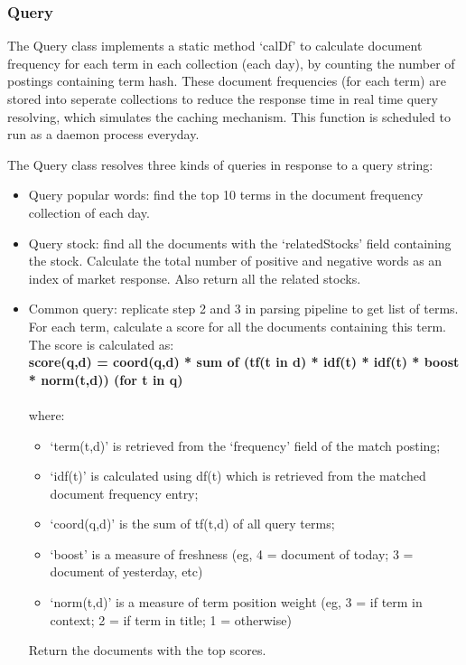\documentclass{article}
\begin{document}
\subsubsection{Query}
The Query class implements a static method `calDf' to calculate document frequency for each term in each collection (each day), by counting the number of postings containing term hash. These document frequencies (for each term) are stored into seperate collections to reduce the response time in real time query resolving, which simulates the caching mechanism. This function is scheduled to run as a daemon process everyday.

The Query class resolves three kinds of queries in response to a query string: 
\begin{itemize}
  \item Query popular words: find the top 10 terms in the document frequency collection of each day. 
  \item Query stock: find all the documents with the `relatedStocks' field containing the stock. Calculate the total number of positive and negative words as an index of market response. Also return all the related stocks.
  \item Common query: replicate step 2 and 3 in parsing pipeline to get list of terms. For each term, calculate a score for all the documents containing this term. The score is calculated as:\\ 
  \textbf{score(q,d) = coord(q,d) * sum of (tf(t in d) * idf(t) * idf(t) * boost * norm(t,d)) (for t in q)} \\ \\
  where:
  \begin{itemize}
    \item `term(t,d)' is retrieved from the `frequency' field of the match posting; 
    \item `idf(t)' is calculated using df(t) which is retrieved from the matched document frequency entry; 
    \item `coord(q,d)' is the sum of tf(t,d) of all query terms; 
    \item `boost' is a measure of freshness (eg, 4 = document of today; 3 = document of yesterday, etc)
    \item `norm(t,d)' is a measure of term position weight (eg, 3 = if term in context; 2 = if term in title; 1 = otherwise)
  \end{itemize}
  Return the documents with the top scores.
\end{itemize}
\end{document}
